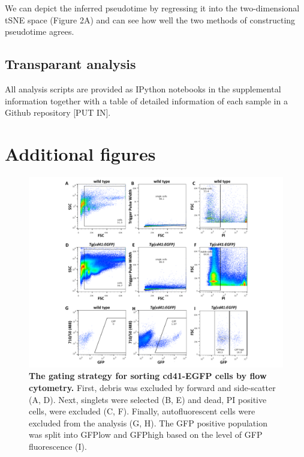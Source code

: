 We can depict the inferred pseudotime by regressing it into the two-dimensional tSNE space (Figure 2A) and can see how well the two methods of constructing pseudotime agrees.

\subsection{Transparant analysis}

All analysis scripts are provided as IPython notebooks in the supplemental information together with a table of detailed information of each sample in a Github repository [PUT IN].

\section{Additional figures}

\begin{figure}
    \centering
    \includegraphics[width=\textwidth]{"SF1"}
    \caption[The gating strategy for sorting cd41-EGFP cells by flow cytometry]{\textbf{The gating strategy for sorting cd41-EGFP cells by flow cytometry.} First, debris was excluded by forward and side-scatter (A, D). Next, singlets were selected (B, E) and dead, PI positive cells, were excluded (C, F). Finally, autofluorescent cells were excluded from the analysis (G, H). The GFP positive population was split into GFPlow and GFPhigh based on the level of GFP fluorescence (I).}
    \label{fig:gating}
\end{figure}

